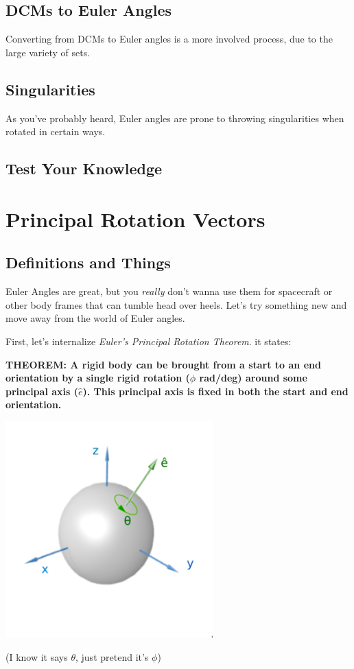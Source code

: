 \documentclass[a4paper,14pt]{extreport}
\begin{document}
\section{DCMs to Euler Angles}
Converting from DCMs to Euler angles is a more involved process, due to the large variety of sets.
\section{Singularities}
As you've probably heard, Euler angles are prone to throwing singularities when rotated in certain ways.
\section{Test Your Knowledge}

\chapter{Principal Rotation Vectors}
\section{Definitions and Things}

Euler Angles are great, but you \emph{really} don't wanna use them for spacecraft or other body frames that can tumble head over heels. Let's try something new and move away from the world of Euler angles. 

First, let's internalize \emph{Euler's Principal Rotation Theorem}. it states:

\begin{center}
\textbf{THEOREM: A rigid body can be brought from a start to an end orientation by a single rigid rotation ($\phi$ rad/deg) around some principal axis ($\hat{e}$). This principal axis is fixed in both the start and end orientation.}
\end{center}

\begin{center}
\includegraphics[width=8cm]{PRV1}

(I know it says $\theta$, just pretend it's $\phi$)
\end{center}
\end{document}
